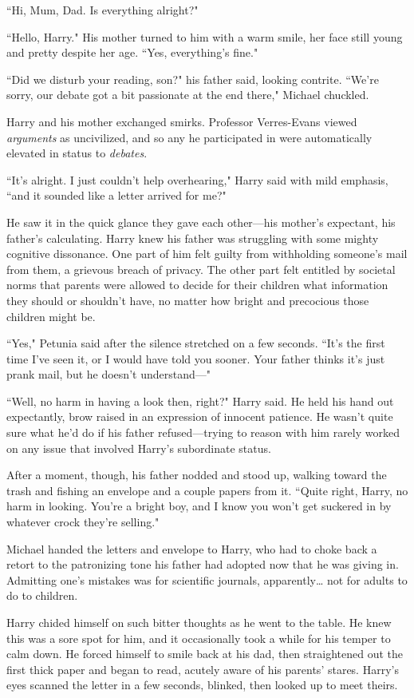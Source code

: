 ``Hi, Mum, Dad. Is everything alright?"

``Hello, Harry." His mother turned to him with a warm smile, her face still young and pretty despite her age. ``Yes, everything's fine."

``Did we disturb your reading, son?" his father said, looking contrite. ``We're sorry, our debate got a bit passionate at the end there," Michael chuckled.

Harry and his mother exchanged smirks. Professor Verres-Evans viewed \emph{arguments} as uncivilized, and so any he participated in were automatically elevated in status to \emph{debates}.

``It's alright. I just couldn't help overhearing," Harry said with mild emphasis, ``and it sounded like a letter arrived for me?"

He saw it in the quick glance they gave each other---his mother's expectant, his father's calculating. Harry knew his father was struggling with some mighty cognitive dissonance. One part of him felt guilty from withholding someone's mail from them, a grievous breach of privacy. The other part felt entitled by societal norms that parents were allowed to decide for their children what information they should or shouldn't have, no matter how bright and precocious those children might be.

``Yes," Petunia said after the silence stretched on a few seconds. ``It's the first time I've seen it, or I would have told you sooner. Your father thinks it's just prank mail, but he doesn't understand---"

``Well, no harm in having a look then, right?" Harry said. He held his hand out expectantly, brow raised in an expression of innocent patience. He wasn't quite sure what he'd do if his father refused---trying to reason with him rarely worked on any issue that involved Harry's subordinate status.

After a moment, though, his father nodded and stood up, walking toward the trash and fishing an envelope and a couple papers from it. ``Quite right, Harry, no harm in looking. You're a bright boy, and I know you won't get suckered in by whatever crock they're selling."

Michael handed the letters and envelope to Harry, who had to choke back a retort to the patronizing tone his father had adopted now that he was giving in. Admitting one's mistakes was for scientific journals, apparently{\ldots} not for adults to do to children.

Harry chided himself on such bitter thoughts as he went to the table. He knew this was a sore spot for him, and it occasionally took a while for his temper to calm down. He forced himself to smile back at his dad, then straightened out the first thick paper and began to read, acutely aware of his parents' stares. Harry's eyes scanned the letter in a few seconds, blinked, then looked up to meet theirs.

